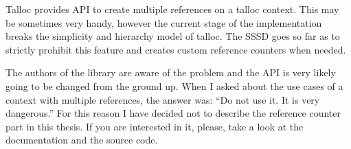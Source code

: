 Talloc provides API to create multiple references on a talloc context. This may
be sometimes very handy, however the current stage of the implementation breaks
the simplicity and hierarchy model of talloc. The SSSD goes so far as to
strictly prohibit this feature and creates custom reference counters when
needed.

The authors of the library are aware of the problem and the API is very likely
going to be changed from the ground\cite{MailListReferences} up. When I asked
about the use cases of a context with multiple references, the answer was: ``Do
not use it. It is very dangerous.'' For this reason I have decided not to
describe the reference counter part in this thesis. If you are interested in
it, please, take a look at the documentation\cite{TallocDocReferences} and the
source code.
